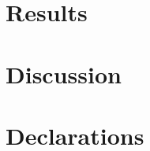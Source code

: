 \documentclass[11pt,a4paper]{article}
\begin{document}
\section{Results}


\section{Discussion}


\FloatBarrier
\clearpage
%
\begingroup
\makeatletter
\renewcommand\paragraph{\@startsection{paragraph}{4}{\z@}%
  {1.5ex \@plus 0.4ex \@minus 0.2ex}%
  {-1em}%
  {\normalfont\normalsize\bfseries}}
\makeatother
\small
\section*{Declarations}

\endgroup

\renewcommand{\bibfont}{\small}
\setlength{\bibsep}{1pt plus 0.5pt minus 0.5pt}


\end{document}
